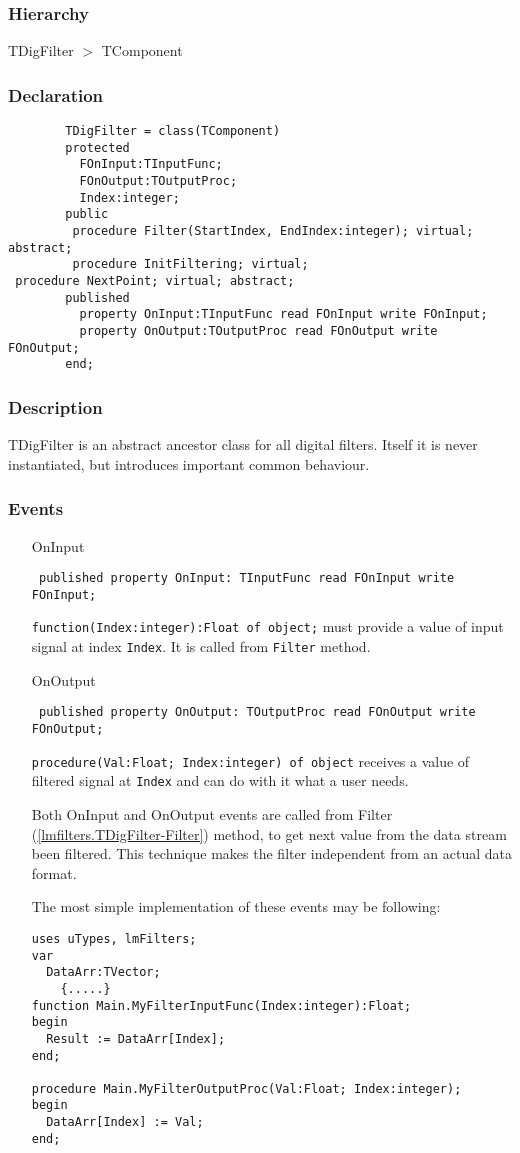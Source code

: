 \documentclass[12pt,a4paper,oneside]{report}
\newcommand{\inlineitem}[1]{{\addfontfeatures{FakeBold} #1}}
\newcommand{\code}[1]{\texttt{#1}}
\begin{document}
\subsubsection{Hierarchy}
TDigFilter {$>$} TComponent
\subsubsection{Declaration}
	\begin{verbatim}
		TDigFilter = class(TComponent)
		protected
		  FOnInput:TInputFunc;
		  FOnOutput:TOutputProc;
		  Index:integer;
		public
		 procedure Filter(StartIndex, EndIndex:integer); virtual; abstract;
		 procedure InitFiltering; virtual;
 procedure NextPoint; virtual; abstract;
		published
		  property OnInput:TInputFunc read FOnInput write FOnInput;
		  property OnOutput:TOutputProc read FOnOutput write FOnOutput;
		end;
		\end{verbatim}
\subsubsection{Description}
TDigFilter is an abstract ancestor class for all digital filters. Itself it is never instantiated, but introduces important common behaviour. 
\subsubsection{Events}
\begin{itemize}\label{lmfilters.TDigFilter-OnInput}
	\item[\inlineitem{OnInput}\hfill]
	\begin{flushleft}
		\code{
			published property OnInput: TInputFunc read FOnInput write FOnInput;}
	\end{flushleft}
	\par \code{function(Index:integer):Float of object;} must provide a value of input signal at index \code{Index}. It is called from \code{Filter}\label{lmfilters.TDigFilter-OnOutput} method.
	\item[\inlineitem{OnOutput}\hfill]
	\begin{flushleft}
		\code{
			published property OnOutput: TOutputProc read FOnOutput write FOnOutput;}
	\end{flushleft}
	\par \code{procedure(Val:Float; Index:integer) of object} receives a value of filtered signal at \code{Index} and can do with it what a user needs.

	Both OnInput and OnOutput events are called from Filter (\ref{lmfilters.TDigFilter-Filter}) method, to get next value from the data stream been filtered. This technique makes the filter independent from an actual data format.

	The most simple implementation of these events may be following:
\begin{verbatim}
uses uTypes, lmFilters;
var
  DataArr:TVector;
	{.....}
function Main.MyFilterInputFunc(Index:integer):Float;
begin
  Result := DataArr[Index];
end;

procedure Main.MyFilterOutputProc(Val:Float; Index:integer);
begin
  DataArr[Index] := Val;
end;
\end{verbatim}
\end{itemize}
\end{document}

